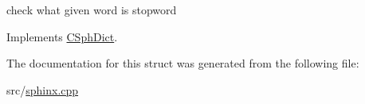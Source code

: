 check what given word is stopword 



Implements \hyperlink{classCSphDict_a5237fd1aa3eceb2fc3422d057af4986d}{C\-Sph\-Dict}.



The documentation for this struct was generated from the following file\-:\begin{DoxyCompactItemize}
\item 
src/\hyperlink{sphinx_8cpp}{sphinx.\-cpp}\end{DoxyCompactItemize}
